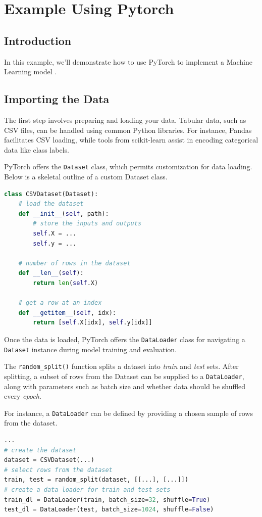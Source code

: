 \documentclass[nobib]{tufte-handout} %
\begin{document}
 \section{Example Using Pytorch} 
 \subsection{Introduction}%
  \label{sub:Introduction}
  
In this example, we'll demonstrate how to use PyTorch to implement a Machine Learning model \citep{brownlee_2023}.

\subsection{Importing the Data}
The first step involves preparing and loading your data. Tabular data, such as CSV files, can be handled using common Python libraries. For instance, Pandas facilitates CSV loading, while tools from scikit-learn assist in encoding categorical data like class labels.

PyTorch offers the \texttt{Dataset} class, which permits customization for data loading. Below is a skeletal outline of a custom Dataset class.

\begin{lstlisting}[language=Python, caption=Python code for a PyTorch Dataset class]
class CSVDataset(Dataset):
    # load the dataset
    def __init__(self, path):
        # store the inputs and outputs
        self.X = ...
        self.y = ...
 
    # number of rows in the dataset
    def __len__(self):
        return len(self.X)
 
    # get a row at an index
    def __getitem__(self, idx):
        return [self.X[idx], self.y[idx]]
\end{lstlisting}
Once the data is loaded, PyTorch offers the \texttt{DataLoader} class for navigating a \texttt{Dataset} instance during model training and evaluation. 

The \texttt{random\_split()} function splits a dataset into \textit{train} and \textit{test} sets. After splitting, a subset of rows from the Dataset can be supplied to a \texttt{DataLoader}, along with parameters such as batch size and whether data should be shuffled every \textit{epoch}.

For instance, a \texttt{DataLoader} can be defined by providing a chosen sample of rows from the dataset.
\begin{lstlisting}[language=Python, caption=Python code for creating a DataLoader instance]
...
# create the dataset
dataset = CSVDataset(...)
# select rows from the dataset
train, test = random_split(dataset, [[...], [...]])
# create a data loader for train and test sets
train_dl = DataLoader(train, batch_size=32, shuffle=True)
test_dl = DataLoader(test, batch_size=1024, shuffle=False)
\end{lstlisting}
\end{document}
